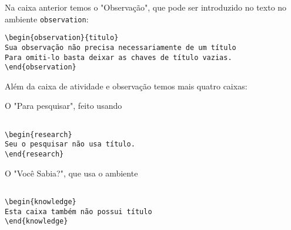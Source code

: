 




Na caixa anterior temos o "Observação", que pode ser introduzido no texto no ambiente \verb|observation|:
\begin{verbatim}
\begin{observation}{titulo}
Sua observação não precisa necessariamente de um título
Para omiti-lo basta deixar as chaves de título vazias.
\end{observation}
\end{verbatim}

Além da caixa de atividade e observação temos mais quatro caixas:

\begin{research}
O "Para pesquisar", feito usando

\begin{verbatim}

\begin{research}
Seu o pesquisar não usa título.
\end{research}
\end{verbatim}
\end{research}

\begin{knowledge}
O "Você Sabia?", que usa o ambiente

\begin{verbatim}

\begin{knowledge}
Esta caixa também não possui título
\end{knowledge}
\end{verbatim}
\end{knowledge}

